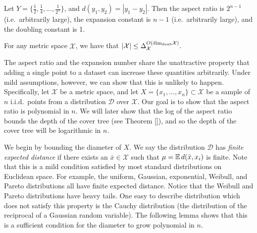 \documentclass[../main.tex]{subfiles}
\newcommand{\set}[1]{\mathcal {#1}}
\newcommand{\distribution}[1]{\mathcal {#1}}
\newcommand{\dist}[2]{\distf({#1},{#2})}
\newcommand{\distf}{d}
\newcommand{\aspect}[1]{\Delta_{#1}}
\newcommand{\doubdim}{\text{dim}_\textnormal{doub}}
\begin{document}
\begin{example}
    Let $Y=\{\frac 1 2, \frac 1 4, ..., \frac 1 {2^n}\}$,
    and $\dist{y_1}{y_2}=|y_1-y_2|$.
    Then the aspect ratio is $2^{n-1}$ (i.e.\ arbitrarily large),
    the expansion constant is $n-1$ (i.e.\ arbitrarily large),
    and the doubling constant is 1.
\end{example}

\begin{lemma}
    For any metric space $\set X$, we have that
    $
        |\set X| \le \aspect{\set X}^{O(\doubdim{\set X})}.
    $
\end{lemma}



The aspect ratio and the expansion number share the unattractive property that adding a single point to a dataset can increase these quantities arbitrarily.
Under mild assumptions, however, we can show that this is unlikely to happen.
Specifically, let $\set X$ be a metric space, 
and let $X=\{x_1,...,x_n\}\subset\set X$ be a sample of $n$ i.i.d.\ points from a distribution $\distribution D$ over $\set X$.
Our goal is to show that the aspect ratio is polynomial in $n$.
We will later show that the log of the aspect ratio bounds the depth of the cover tree (see Theorem \ref{}),
and so the depth of the cover tree will be logarithmic in $n$.

We begin by bounding the diameter of $X$.
We say the distribution $\distribution D$ has \emph{finite expected distance} if there exists an $\bar x\in\set X$ such that $\mu=\E\dist{\bar x}{x_i}$ is finite.
Note that this is a mild condition satisfied by most standard distributions on Euclidean space.
For example, the uniform, Gaussian, exponential, Weibull, and Pareto distributions all have finite expected distance.
Notice that the Weibull and Pareto distributions have heavy tails.
One easy to describe distribution which does not satisfy this property is the Cauchy distribution 
(the distribution of the reciprocal of a Gaussian random variable).
The following lemma shows that this is a sufficient condition for the diameter to grow polynomial in $n$.
\end{document}
